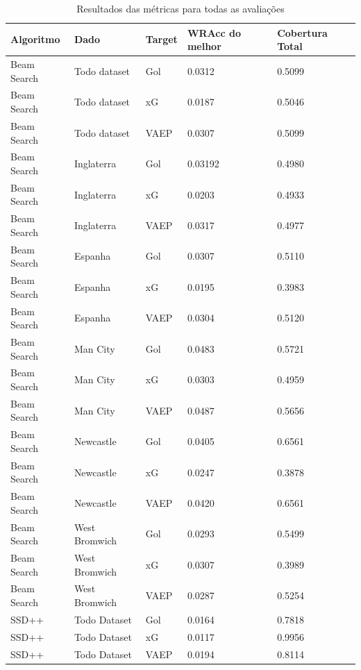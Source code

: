\documentclass{article}
\begin{document}
\begin{table}[H]
	\centering
	\begin{tabular}{|l|l|l|l|l|}
		\hline
		\textbf{Algoritmo} & \textbf{Dado} &  \textbf{Target} & 
		\textbf{WRAcc do melhor} & \textbf{Cobertura Total}
		\\
		\hline
		Beam Search & Todo dataset & Gol & 0.0312 & 0.5099 
		\\
		\hline
		Beam Search & Todo dataset & xG & 0.0187 & 0.5046 
		\\
		\hline
		Beam Search & Todo dataset & VAEP & 0.0307 & 0.5099 
		\\
		\hline
		Beam Search & Inglaterra & Gol & 0.03192 & 0.4980 
		\\
		\hline
		Beam Search & Inglaterra & xG & 0.0203 & 0.4933 
		\\
		\hline
		Beam Search & Inglaterra & VAEP & 0.0317 & 0.4977
		\\
		\hline
		Beam Search & Espanha & Gol & 0.0307 & 0.5110 
		\\
		\hline
		Beam Search & Espanha & xG & 0.0195 & 0.3983 
		\\
		\hline
		Beam Search & Espanha & VAEP & 0.0304 & 0.5120 
		\\
		\hline
		Beam Search & Man City & Gol & 0.0483 & 0.5721 
		\\
		\hline
		Beam Search & Man City & xG & 0.0303 & 0.4959 
		\\
		\hline
		Beam Search & Man City & VAEP & 0.0487 & 0.5656 
		\\
		\hline
		Beam Search & Newcastle & Gol & 0.0405 & 0.6561 
		\\
		\hline
		Beam Search & Newcastle & xG & 0.0247 & 0.3878 
		\\
		\hline
		Beam Search & Newcastle & VAEP & 0.0420 & 0.6561 
		\\
		\hline
		Beam Search & West Bromwich & Gol & 0.0293 & 0.5499 
		\\
		\hline
		Beam Search & West Bromwich & xG & 0.0307 & 0.3989 
		\\
		\hline
		Beam Search & West Bromwich & VAEP & 0.0287 & 0.5254 
		\\
		\hline
		SSD++ & Todo Dataset & Gol & 0.0164 & 0.7818 
		\\
		\hline
		SSD++ & Todo Dataset & xG & 0.0117 & 0.9956
		\\
		\hline
		SSD++ & Todo Dataset & VAEP & 0.0194 & 0.8114
		\\
		\hline
	\end{tabular}
	\caption{Resultados das métricas para todas as avaliações}
	\label{tab:resultMetricas}
\end{table}
\end{document}
